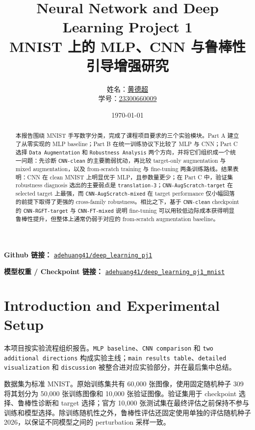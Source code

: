 \documentclass[12pt,a4paper,fontset=fandol]{ctexart}
\title{Neural Network and Deep Learning Project 1\\
\large MNIST 上的 MLP、CNN 与鲁棒性引导增强研究}
\author{
姓名：\underline{黄德超}\\
学号：\underline{23300660009}
}
\date{\today}
\begin{document}
\maketitle

\noindent
\textbf{Github 链接：}
\href{https://github.com/adehuang41/deep_learning_pj1.git}
{\texttt{adehuang41/deep\_learning\_pj1}}

\noindent
\textbf{模型权重 / Checkpoint 链接：}
\href{https://www.modelscope.cn/adehuang41/deep_learning_pj1_mnist}{\texttt{adehuang41/deep\_learning\_pj1\_mnist}}

\begin{abstract}
本报告围绕 MNIST 手写数字分类，完成了课程项目要求的三个实验模块。Part A 建立了从零实现的 MLP baseline；Part B 在统一训练协议下比较了 MLP 与 CNN；Part C 选择 \texttt{Data Augmentation} 和 \texttt{Robustness Analysis} 两个方向，并将它们组织成一个统一问题：先诊断 \texttt{CNN-clean} 的主要脆弱扰动，再比较 target-only augmentation 与 mixed augmentation，以及 from-scratch training 与 fine-tuning 两条训练路线。结果表明：CNN 在 clean MNIST 上明显优于 MLP，且参数量更少；在 Part C 中，验证集 robustness diagnosis 选出的主要弱点是 \texttt{translation-3}；\texttt{CNN-AugScratch-target} 在 selected target 上最强，而 \texttt{CNN-AugScratch-mixed} 在 target performance 仅小幅回落的前提下取得了更强的 cross-family robustness。相比之下，基于 \texttt{CNN-clean} checkpoint 的 \texttt{CNN-RGFT-target} 与 \texttt{CNN-FT-mixed} 说明 fine-tuning 可以用较低边际成本获得明显鲁棒性提升，但整体上通常仍弱于对应的 from-scratch augmentation baseline。
\end{abstract}

\section{Introduction and Experimental Setup}

本项目按实验流程组织报告。\texttt{MLP baseline}、\texttt{CNN comparison} 和 \texttt{two additional directions} 构成实验主线；\texttt{main results table}、\texttt{detailed visualization} 和 \texttt{discussion} 被整合进对应实验部分，并在最后集中总结。

数据集为标准 MNIST。原始训练集共有 60{,}000 张图像，使用固定随机种子 309 将其划分为 50{,}000 张训练图像和 10{,}000 张验证图像。验证集用于 checkpoint 选择、鲁棒性诊断和 target 选择；官方 10{,}000 张测试集在最终评估之前保持不参与训练和模型选择。除训练随机性之外，鲁棒性评估还固定使用单独的评估随机种子 2026，以保证不同模型之间的 perturbation 采样一致。
\end{document}
